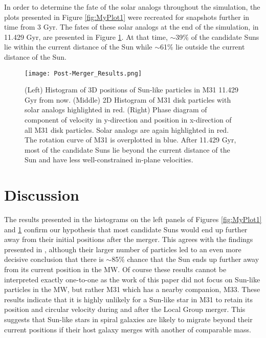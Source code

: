 \documentclass{aastex63}
\begin{document}
In order to determine the fate of the solar analogs throughout the simulation, the plots presented in Figure \ref{fig:MyPlot1} were recreated for snapshots further in time from 3 Gyr. The fates of these solar analogs at the end of the simulation, in 11.429 Gyr, are presented in Figure \ref{fig:MyPlot2}. At that time, $\sim$39\% of the candidate Suns lie within the current distance of the Sun while $\sim$61\% lie outside the current distance of the Sun.

\begin{figure}[h!]
    \centering
    \texttt{[image: Post-Merger\_Results.png]}
    \caption{(Left) Histogram of 3D positions of Sun-like particles in M31 11.429 Gyr from now. (Middle) 2D Histogram of M31 disk particles with solar analogs highlighted in red. (Right) Phase diagram of component of velocity in y-direction and position in x-direction of all M31 disk particles. Solar analogs are again highlighted in red. The rotation curve of M31 is overplotted in blue. After 11.429 Gyr, most of the candidate Suns lie beyond the current distance of the Sun and have less well-constrained in-plane velocities.}
    \label{fig:MyPlot2}
\end{figure}

\section{Discussion}
The results presented in the histograms on the left panels of Figures \ref{fig:MyPlot1} and \ref{fig:MyPlot2} confirm our hypothesis that most candidate Suns would end up further away from their initial positions after the merger. This agrees with the findings presented in \cite{2012ApJ...753....9V}, although their larger number of particles led to an even more decisive conclusion that there is $\sim$85\% chance that the Sun ends up further away from its current position in the MW. Of course these results cannot be interpreted exactly one-to-one as the work of this paper did not focus on Sun-like particles in the MW, but rather M31 which has a nearby companion, M33. These results indicate that it is highly unlikely for a Sun-like star in M31 to retain its position and circular velocity during and after the Local Group merger. This suggests that Sun-like stars in spiral galaxies are likely to migrate beyond their current positions if their host galaxy merges with another of comparable mass.
\end{document}
